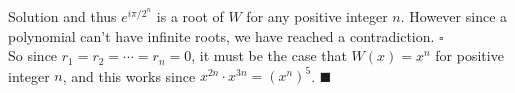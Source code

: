 \documentclass{article}
\begin{document}
\begin{solution}{Solution}
and thus $e^{i\pi/2^n}$ is a root of $W$ for any positive integer $n$.
However since a polynomial can't have infinite roots, we have reached a
contradiction. $\square$ \\

So since $r_1 = r_2 = \cdots = r_n = 0$, it must be the case that
$W(x) = x^n$ for positive integer $n$, and this works since
$x^{2n} \cdot x^{3n} = (x^n)^5$. $\blacksquare$
\end{solution}
\end{document}
